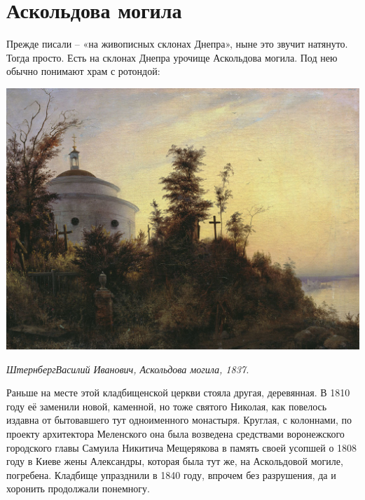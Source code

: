 \chapter{Аскольдова могила}

Прежде писали – «на живописных склонах Днепра», ныне это звучит натянуто. Тогда просто. Есть на склонах Днепра урочище Аскольдова могила. Под нею обычно понимают храм с ротондой:

\begin{center}
\includegraphics[width=\linewidth]{chast-volga/oskoldidir/ascoldova_mogila_1837.jpg}

\textit{ШтернбергВасилий Иванович, Аскольдова могила, 1837.}
\end{center}

Раньше на месте этой кладбищенской церкви стояла другая, деревянная. В 1810 году её заменили новой, каменной, но тоже святого Николая, как повелось издавна от бытовавшего тут одноименного монастыря. Круглая, с колоннами, по проекту архитектора Меленского она была возведена средствами воронежского городского главы Самуила Никитича Мещерякова в память своей усопшей о 1808 году в Киеве жены Александры, которая была тут же, на Аскольдовой могиле, погребена. Кладбище упразднили в 1840 году, впрочем без разрушения, да и хоронить продолжали понемногу.

